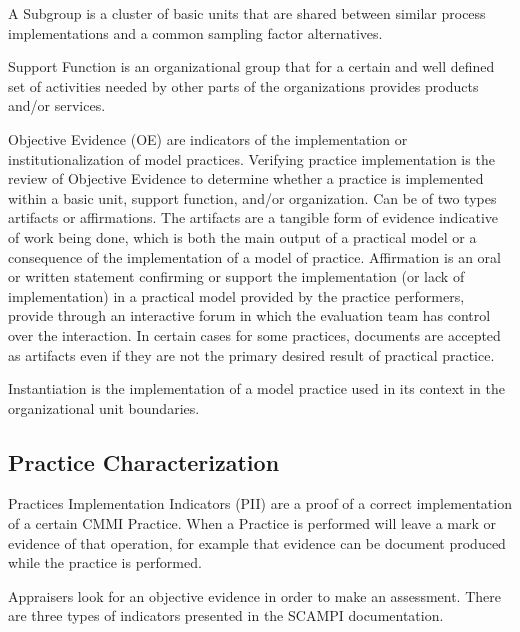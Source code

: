 A Subgroup is a cluster of basic units that are shared between similar process implementations and a common sampling factor alternatives.

Support Function is an organizational group that for a certain and well defined set of activities needed by other parts of the organizations provides products and/or services.


Objective Evidence (OE) are indicators of the implementation or institutionalization of model practices. Verifying practice implementation is the review of Objective Evidence to determine whether a practice is implemented within a basic unit, support function, and/or organization. Can be of two types artifacts or affirmations.
The artifacts are a tangible form of evidence indicative of work being done, which is both the main output of a practical model or a consequence of the implementation of a model of practice.
Affirmation is an oral or written statement confirming or support the implementation (or lack of implementation) in a practical model
provided by the practice performers, provide through an interactive forum in which the evaluation team has control over the
interaction.
In certain cases for some practices, documents are accepted as artifacts even if they are not the primary desired result of practical practice.

Instantiation is the implementation of a model practice used in its context in the organizational unit boundaries.

\subsection{Practice Characterization}
Practices Implementation Indicators (PII) are a proof of  a correct implementation of a certain CMMI Practice. When a Practice is performed will leave a mark or evidence of that operation, for example that evidence can be document produced while the practice is performed.

Appraisers look for an objective evidence in order to make an assessment. There are three types of indicators presented in the SCAMPI documentation.



